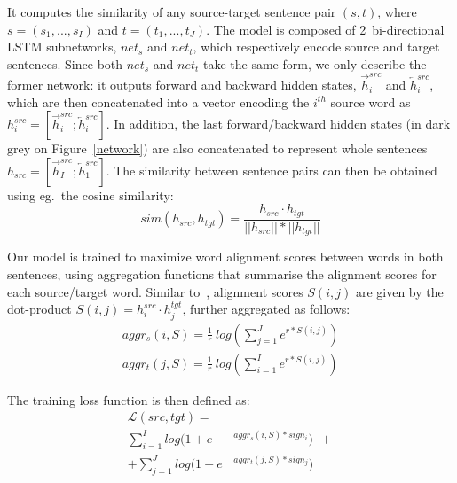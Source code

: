 \documentclass[11pt,a4paper]{article}
\begin{document}
It computes the similarity of any source-target sentence pair $(s,t)$, where $s=(s_1,...,s_I)$ and $t=(t_1,...,t_J)$. 
The model is composed of 2~bi-directional LSTM subnetworks, $net_s$ and $net_t$, which respectively encode source and target sentences. 
Since both $net_s$ and $net_t$ take the same form, we only describe the former network: 
it outputs forward and backward hidden states, $\overrightarrow{h}^{src}_i$ and $\overleftarrow{h}^{src}_i$, which are then concatenated into a vector encoding the $i^{th}$ source word as $h^{src}_i = [ \overrightarrow{h}^{src}_i ; \overleftarrow{h}^{src}_i ]$.
In addition, the last forward/backward hidden states (in dark grey on Figure~\ref{network}) are also concatenated  to represent whole sentences 
$h_{src} = [ \overrightarrow{h}^{src}_I ; \overleftarrow{h}^{src}_1 ]$.
The similarity between sentence pairs can then be obtained using eg.\ the cosine similarity:
\begin{equation}
    sim(h_{src}, h_{tgt}) = \frac{h_{src} \cdotp h_{tgt}}{||h_{src}|| * ||h_{tgt}||}
    \label{cosine}
\end{equation}

Our model is trained to maximize word alignment scores between words in both sentences, using aggregation functions that summarise the alignment scores for each source/target word. 
Similar to~\cite{W16-2207}, alignment scores $S(i,j)$ are given by the dot-product $S(i,j) = h_i^{src} \cdotp h_j^{tgt}$, further aggregated as follows:
\begin{equation}
\begin{split}
    aggr_s(i,S) = \frac{1}{r} \ log \left( \displaystyle \sum_{j=1}^{J} e^{r * S(i,j)}\right) \\
    aggr_t(j,S) = \frac{1}{r} \ log \left( \displaystyle \sum_{i=1}^{I} e^{r * S(i,j)}\right)
\end{split}
\label{aggregation}
\end{equation}


The training loss function is then defined as:
\begin{equation}
\begin{split}
\mathcal{L}(src,tgt) = \ \ \ \ & \\
    \sum_{i=1}^I log(1+e&^{aggr_s(i,S) * sign_i}) \ \ +\\
 + \sum_{j=1}^J log(1+e&^{aggr_t(j,S) * sign_j})
\end{split}
\label{loss_wemb}
\end{equation}
\end{document}
